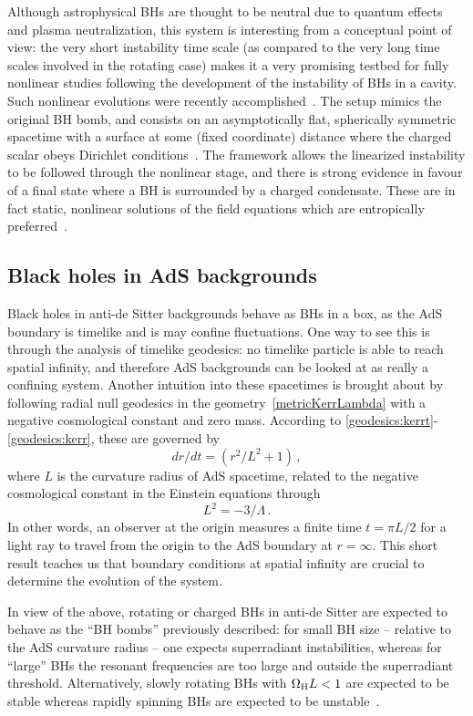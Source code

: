 \documentclass[11pt]{article}
\newcommand{\be}{\begin{equation}}
\newcommand{\ee}{\end{equation}}
\numberwithin{equation}{section} %
\begin{document}
Although astrophysical BHs are thought to be neutral due to quantum effects and plasma neutralization, this system is 
interesting from a conceptual point of view: the very short instability time scale (as compared to the very long time 
scales involved in the rotating case) makes it a very promising testbed for fully nonlinear studies following the 
development of the instability of BHs in a cavity. Such nonlinear evolutions were recently accomplished~\cite{Sanchis-Gual:2015lje,Sanchis-Gual:2016tcm}. The setup mimics the original BH bomb, and consists on an asymptotically flat, spherically symmetric spacetime with a surface at some (fixed coordinate) distance where the charged scalar obeys 
Dirichlet conditions~\cite{Sanchis-Gual:2015lje,Sanchis-Gual:2016tcm}. The framework allows the linearized instability to be followed through the nonlinear stage, and there is strong evidence 
in favour of a final state where a BH is surrounded by a charged condensate. These are in fact static, nonlinear solutions of the field equations which are entropically preferred~\cite{Dolan:2015dha}.

\subsection{Black holes in AdS backgrounds}\label{sec:AdS}
Black holes in anti-de Sitter backgrounds behave as BHs in a box, as the AdS boundary is
timelike and is may confine fluctuations. One way to see this is through the analysis of timelike geodesics:
no timelike particle is able to reach spatial infinity, and therefore AdS backgrounds can be looked at as 
really a confining system. Another intuition into these spacetimes is brought about by
following radial null geodesics in the geometry~\eqref{metricKerrLambda}
with a negative cosmological constant and zero mass. According to \eqref{geodesics:kerrt}-\eqref{geodesics:kerr}, these are governed by
%
\be
dr/dt=(r^2/L^2+1)\,,
\ee
%
where $L$ is the curvature radius of AdS spacetime, related to the negative
cosmological constant in the Einstein equations through 
%
\be
L^2=-3/\Lambda\,.
\ee
% 
In other words, an observer at the origin measures a finite time
$t=\pi L/2$ for a light ray to travel from the origin to the AdS boundary at $r=\infty$. 
This short result teaches us that boundary conditions at spatial infinity are crucial to determine the evolution of the system.


In view of the above, rotating or charged BHs in anti-de Sitter are expected to behave as the ``BH bombs'' previously described:
for small BH size -- relative to the AdS curvature radius -- one expects superradiant instabilities, whereas for ``large'' BHs
the resonant frequencies are too large and outside the superradiant threshold. Alternatively, slowly rotating BHs with
$\Omega_{\rm H} L<1$ are expected to be stable whereas rapidly spinning BHs are expected to be 
unstable~\cite{Hawking:1999dp}. 
\end{document}

